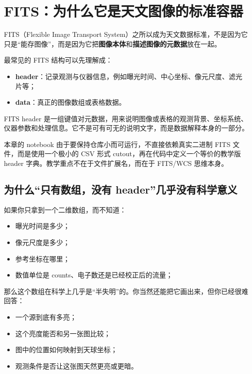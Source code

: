 \section{FITS：为什么它是天文图像的标准容器}

FITS（Flexible Image Transport System）之所以成为天文数据标准，不是因为它只是“能存图像”，而是因为它把\textbf{图像本体}和\textbf{描述图像的元数据}放在一起。

最常见的 FITS 结构可以先理解成：

\begin{itemize}
    \item \textbf{header}：记录观测与仪器信息，例如曝光时间、中心坐标、像元尺度、滤光片等；
    \item \textbf{data}：真正的图像数组或表格数据。
\end{itemize}

\begin{defbox}
FITS header 是一组键值对元数据，用来说明图像或表格的观测背景、坐标系统、仪器参数和处理信息。它不是可有可无的说明文字，而是数据解释本身的一部分。
\end{defbox}

本章的 notebook 由于要保持仓库小而可运行，不直接依赖真实二进制 FITS 文件，而是使用一个极小的 CSV 形式 cutout，再在代码中定义一个等价的教学版 header 字典。教学重点不在于文件扩展名，而在于 FITS/WCS 思维本身。

\subsection{为什么“只有数组，没有 header”几乎没有科学意义}

如果你只拿到一个二维数组，而不知道：

\begin{itemize}
    \item 曝光时间是多少；
    \item 像元尺度是多少；
    \item 参考坐标在哪里；
    \item 数值单位是 counts、电子数还是已经校正后的流量；
\end{itemize}

那么这个数组在科学上几乎是“半失明”的。你当然还能把它画出来，但你已经很难回答：

\begin{itemize}
    \item 一个源到底有多亮；
    \item 这个亮度能否和另一张图比较；
    \item 图中的位置如何映射到天球坐标；
    \item 观测条件是否让这张图天然更亮或更暗。
\end{itemize}

